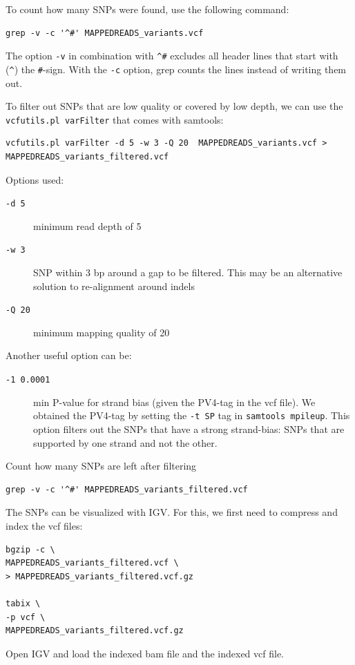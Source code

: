 \documentclass[11pt]{article}
\begin{document}
To count how many SNPs were found, use the following command:

\begin{verbatim}
grep -v -c '^#' MAPPEDREADS_variants.vcf
\end{verbatim}

The option \texttt{-v} in combination with \texttt{\textasciicircum{}\#} excludes all header lines
that start with (\texttt{\textasciicircum{}}) the \texttt{\#}-sign. With the \texttt{-c} option, grep counts
the lines instead of writing them out.


To filter out SNPs that are low quality or covered by low depth, we
can use the \texttt{vcfutils.pl varFilter} that comes with samtools:

\begin{verbatim}
vcfutils.pl varFilter -d 5 -w 3 -Q 20  MAPPEDREADS_variants.vcf > MAPPEDREADS_variants_filtered.vcf
\end{verbatim}


Options used:
\begin{description}
\item[{\texttt{-d 5}}] minimum read depth of 5
\item[{\texttt{-w 3}}] SNP within 3 bp around a gap to be filtered. This may be
an alternative solution to re-alignment around indels
\item[{\texttt{-Q 20}}] minimum mapping quality of 20
\end{description}

Another useful option can be:
\begin{description}
\item[{\texttt{-1 0.0001}}] min P-value for strand bias (given the PV4-tag in the
vcf file). We obtained the PV4-tag by setting the \texttt{-t SP} tag in
\texttt{samtools mpileup}. This option filters out the SNPs that have a
strong strand-bias: SNPs that are supported by one strand and not
the other.
\end{description}


Count how many SNPs are left after filtering

\begin{verbatim}
grep -v -c '^#' MAPPEDREADS_variants_filtered.vcf
\end{verbatim}

The SNPs can be visualized with IGV. For this, we first need to
compress and index the vcf files: 

\begin{verbatim}
bgzip -c \
MAPPEDREADS_variants_filtered.vcf \
> MAPPEDREADS_variants_filtered.vcf.gz

tabix \
-p vcf \
MAPPEDREADS_variants_filtered.vcf.gz
\end{verbatim}

Open IGV and load the indexed bam file and the indexed vcf file.

\end{document}

